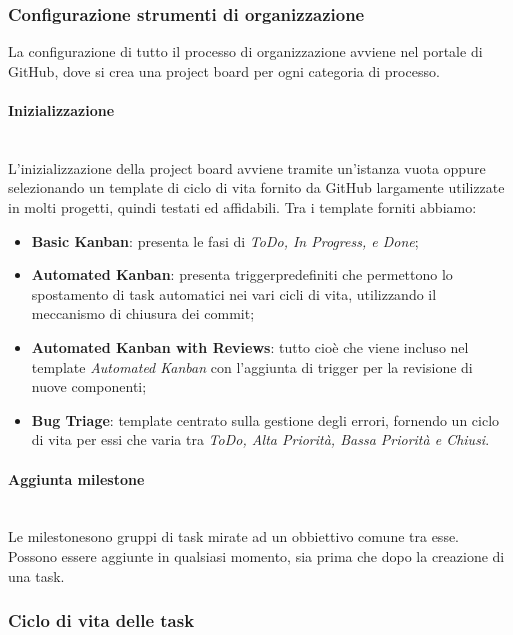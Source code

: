 \subsubsection{Configurazione strumenti di organizzazione}
	La configurazione di tutto il processo di organizzazione avviene nel portale di GitHub, dove si crea una project board per ogni categoria di processo. 	

\paragraph{Inizializzazione} \-\\
 L'inizializzazione della project board avviene tramite un'istanza vuota oppure selezionando un template di ciclo di vita fornito da GitHub largamente utilizzate in molti progetti, quindi testati ed affidabili. Tra i template forniti abbiamo: 

\begin{itemize}
		\item \textbf{Basic Kanban}: presenta le fasi di \textit{ToDo, In Progress, e Done}; 
		\item \textbf{Automated Kanban}: presenta trigger\glossario predefiniti che permettono lo spostamento di task
		 automatici nei vari cicli di vita, utilizzando il meccanismo di chiusura dei commit;
		\item \textbf{Automated Kanban with Reviews}: tutto cioè che viene incluso nel template \textit{Automated Kanban} con l'aggiunta di trigger per la revisione di nuove componenti; 
		\item \textbf{Bug Triage}: template centrato sulla gestione degli errori, fornendo un ciclo di vita per essi che varia tra \textit{ToDo, Alta Priorità, Bassa Priorità e Chiusi}. 
\end{itemize}
	  	
\paragraph{Aggiunta milestone} \-\\
	Le milestone\glossario sono gruppi di task mirate ad un obbiettivo comune tra esse.
	Possono essere aggiunte in qualsiasi momento, sia prima che dopo la creazione di una task.

\subsubsection{Ciclo di vita delle task}

